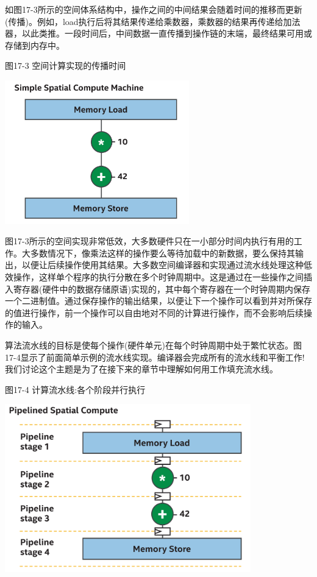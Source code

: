 如图17-3所示的空间体系结构中，操作之间的中间结果会随着时间的推移而更新(传播)。例如，load执行后将其结果传递给乘数器，乘数器的结果再传递给加法器，以此类推。一段时间后，中间数据一直传播到操作链的末端，最终结果可用或存储到内存中。\par

\hspace*{\fill} \par %
图17-3 空间计算实现的传播时间
\begin{center}
	\includegraphics[width=0.6\textwidth]{content/chapter-17/images/3}
\end{center}

图17-3所示的空间实现非常低效，大多数硬件只在一小部分时间内执行有用的工作。大多数情况下，像乘法这样的操作要么等待加载中的新数据，要么保持其输出，以便让后续操作使用其结果。大多数空间编译器和实现通过流水线处理这种低效操作，这样单个程序的执行分散在多个时钟周期中。这是通过在一些操作之间插入寄存器(硬件中的数据存储原语)实现的，其中每个寄存器在一个时钟周期内保存一个二进制值。通过保存操作的输出结果，以便让下一个操作可以看到并对所保存的值进行操作，前一个操作可以自由地对不同的计算进行操作，而不会影响后续操作的输入。\par

算法流水线的目标是使每个操作(硬件单元)在每个时钟周期中处于繁忙状态。图17-4显示了前面简单示例的流水线实现。编译器会完成所有的流水线和平衡工作!我们讨论这个主题是为了在接下来的章节中理解如何用工作填充流水线。\par

\hspace*{\fill} \par %
图17-4 计算流水线:各个阶段并行执行
\begin{center}
	\includegraphics[width=0.8\textwidth]{content/chapter-17/images/5}
\end{center}

